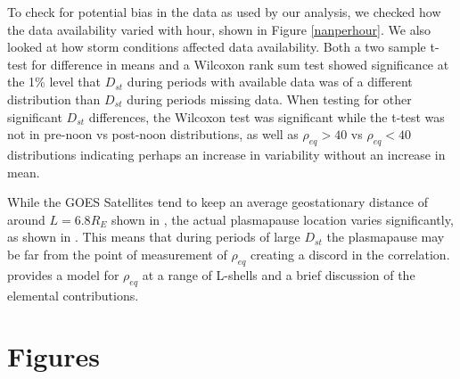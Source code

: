 \documentclass[10pt,twocolumn]{article}
\begin{document}
To check for potential bias in the data as used by our analysis, we checked how the data availability varied with hour, shown in Figure \ref{nanperhour}. We also looked at how storm conditions affected data availability. Both a two sample t-test for difference in means and a Wilcoxon rank sum test showed significance at the 1\% level that $D_{st}$ during periods with available data was of a different distribution than $D_{st}$ during periods missing data. When testing for other significant $D_{st}$ differences, the Wilcoxon test was significant while the t-test was not in pre-noon vs post-noon distributions, as well as $\rho_{eq}>40$ vs $\rho_{eq}<40$ distributions indicating perhaps an increase in variability without an increase in mean.

While the GOES Satellites tend to keep an average geostationary distance of around $L=6.8R_E$ shown in \cite{Takahashi2010}, the actual plasmapause location varies significantly, as shown in \cite{OBrien2003}. This means that during periods of large $D_{st}$ the plasmapause may be far from the point of measurement of $\rho_{eq}$ creating a discord in the correlation. \cite{Gallagher2000} provides a model for $\rho_{eq}$ at a range of L-shells and a brief discussion of the elemental contributions.

\newpage
\footnotesize




\clearpage
\section{Figures}
\end{document}
